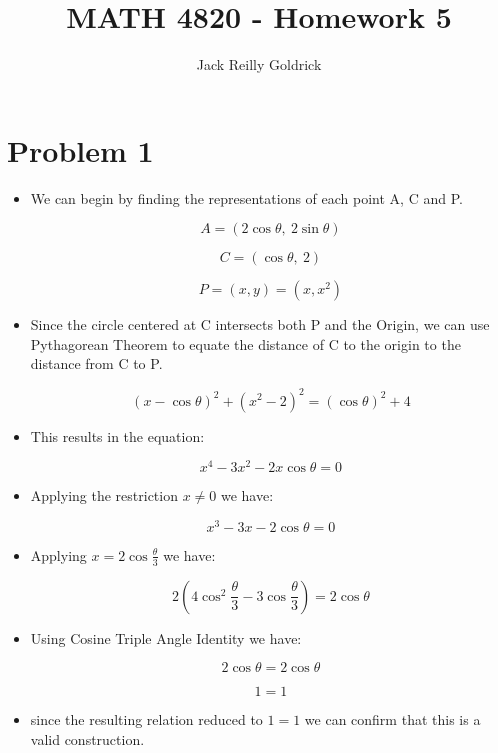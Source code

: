 \documentclass[]{report}
\title{MATH 4820 - Homework 5}
\author{Jack Reilly Goldrick}
\begin{document}
	\maketitle




\section{Problem 1}

\begin{itemize}
	\item We can begin by finding the representations of each point A,  C and P.
	
		$$ A = (2 \cos{\theta}, \ 2 \sin{\theta}) $$
	
		$$ C= (\cos{\theta}, \ 2 ) $$	
		
		$$ P = (x, y) = (x, x^2) $$
	
	\item Since the circle centered at C intersects both P and the Origin, we can use Pythagorean Theorem to equate the distance of C to the origin to the distance from C to P.
	
		$$ (x - \cos{\theta})^{2} + (x^2 - 2)^2 = (\cos{\theta})^2 + 4 $$
	
	\item This results in the equation:
	
		$$ x^4 - 3x^2 - 2 x \cos{\theta} = 0 $$
	
	\item Applying the restriction $ x \neq 0$ we have:
	
		$$ x^3- 3x - 2  \cos{\theta} = 0 $$
		
		
	\item Applying $x = 2 \cos{\frac{\theta }{3}} $ we have:
	
	
		$$ 2 ( 4 \cos^{2}{\frac{\theta }{3}} - 3 \cos{\frac{\theta }{3}})  =  2  \cos{\theta} $$

\item Using Cosine Triple Angle Identity we have:


$$ 2  \cos{\theta} =  2  \cos{\theta} $$

$$ 1 = 1$$



\item since the resulting relation reduced to $1=1$ we can confirm that this is a valid construction.



\begin{flushright}
	\smiley{}
\end{flushright}


\end{itemize}
\end{document}
